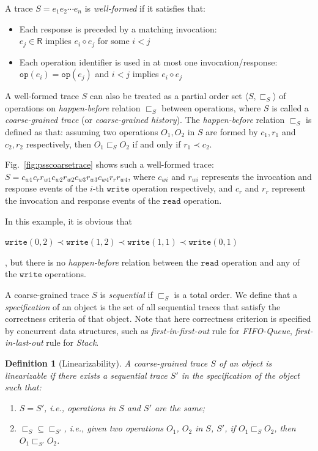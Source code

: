 \documentclass[runningheads]{llncs}
\newcommand{\eresp}{\mathsf{R}}
\newcommand{\pair}[1]{{\langle{#1}\rangle}}
\newtheorem{myDef}{Definition}
\newcommand{\wri}{\mathtt{write}}
\newcommand{\rea}{\mathtt{read}}
\newcommand{\hb}{\textit{happen-before }}
\begin{document}
 A trace $S = e_1e_2\cdots e_n$ is \textit{well-formed} if it satisfies that:
\begin{itemize}
  \item Each response is preceded by a matching invocation:\\
  $e_j\in \eresp$ implies $e_i \diamond e_j$ for some $i<j$
  \item Each operation identifier is used in at most one invocation/response:\\
  $\mathtt{op}(e_i)=\mathtt{op}(e_j)$ and $i<j$ implies $e_i \diamond e_j$
\end{itemize}
 A well-formed trace $S$ can also be treated as a partial order set $\pair{S,\sqsubset_S}$ of operations on \textit{happen-before}  relation $\sqsubset_S$ between operations, where $S$ is called a \textit{coarse-grained trace} (or \textit{coarse-grained history}). The \textit{happen-before} relation $\sqsubset_S$ is defined as that: assuming two operations $O_1,O_2$ in $S$ are formed by $c_1,r_1$ and $c_2,r_2$ respectively, then $O_1\sqsubset_S O_2$ if and only if $r_1\prec c_2$.

\begin{example}
Fig.~\ref{fig:psscoarsetrace} shows such a well-formed trace:
$S = c_{w1}c_rr_{w1}c_{w2}r_{w2}c_{w3}r_{w3}c_{w4}r_{r}r_{w4}$, where $c_{wi}$ and $r_{wi}$
represents the invocation and response events of the $i$-th $\mathtt{write}$ operation respectively, and
$c_r$ and $r_r$ represent the invocation and response events of the $\mathtt{read}$ operation.

In this example, it is obvious that \begin{small}$\wri(0,2)\prec \wri(1,2)\prec \wri(1,1)\prec \wri(0,1)$\end{small}, 
but there is no \hb  
relation between the $\rea$ operation and any of the $\wri$ operations.

\end{example}




A coarse-grained trace $S$ is \textit{sequential} if $\sqsubset_S$ is a total order. 
We define that a \textit{specification} of an object is the set of all sequential traces that satisfy the correctness criteria of that object. 
Note that here correctness criterion is specified by concurrent data structures, such as \textit{first-in-first-out} rule for \textit{FIFO-Queue}, \textit{first-in-last-out} rule for \textit{Stack}.

\begin{myDef}[Linearizability]\label{def:linearizability}
A coarse-grained trace $S$ of an object is linearizable if there exists a sequential trace $S'$ in the specification of the object such that:
\begin{enumerate}
  \item $S = S'$, i.e., operations in $S$ and $S'$ are the same;
  \item $\sqsubset_S \subseteq \sqsubset_{S'}$, i.e., given two operations $O_1$, $O_2$ in $S$, $S'$, if $O_1\sqsubset_S O_2$, then $O_1\sqsubset_{S'} O_2$.
\end{enumerate}
\end{myDef}
\end{document}

